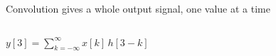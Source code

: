 \documentclass[aspectratio=169,11pt]{beamer}
\begin{document}
\begin{frame}{Convolution gives a whole output signal, one value at a time}
\begin{center}
\begin{BlueCard}[
  width=\textwidth,
  halign=center,
  top=10pt,
  bottom=10pt
]
\begin{columns}[c,totalwidth=0.96\textwidth]
\end{columns}

\vspace{0.10cm}

\begin{BlueBox}[
  calloutshadedblue,
  halign=center,
  fontupper=\large
]{}
\(
y[3]=\sum_{k=-\infty}^{\infty}x[k]\,h[3-k]
\)
\end{BlueBox}

\end{BlueCard}
\end{center}

\end{frame}







\end{document}
